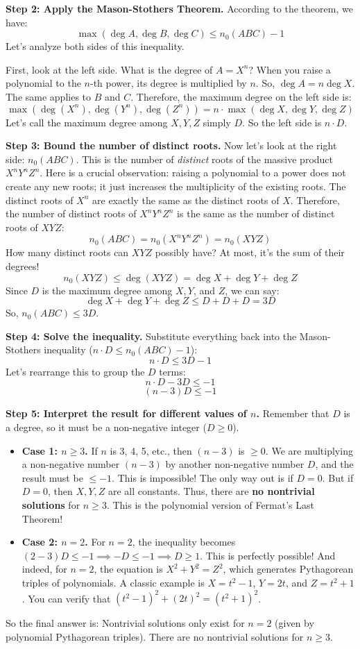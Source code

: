\begin{solution}
\textbf{Step 2: Apply the Mason-Stothers Theorem.}
According to the theorem, we have:
\[ \max(\deg A, \deg B, \deg C) \leq n_0(ABC) - 1 \]
Let's analyze both sides of this inequality.

First, look at the left side. What is the degree of $A = X^n$? When you raise a polynomial to the $n$-th power, its degree is multiplied by $n$. So, $\deg A = n \deg X$. The same applies to $B$ and $C$.
Therefore, the maximum degree on the left side is:
\[ \max(\deg(X^n), \deg(Y^n), \deg(Z^n)) = n \cdot \max(\deg X, \deg Y, \deg Z) \]
Let's call the maximum degree among $X, Y, Z$ simply $D$. So the left side is $n \cdot D$.

\textbf{Step 3: Bound the number of distinct roots.}
Now let's look at the right side: $n_0(ABC)$. This is the number of \textit{distinct} roots of the massive product $X^n Y^n Z^n$.
Here is a crucial observation: raising a polynomial to a power does not create any new roots; it just increases the multiplicity of the existing roots. The distinct roots of $X^n$ are exactly the same as the distinct roots of $X$.
Therefore, the number of distinct roots of $X^n Y^n Z^n$ is the same as the number of distinct roots of $X Y Z$:
\[ n_0(ABC) = n_0(X^n Y^n Z^n) = n_0(XYZ) \]
How many distinct roots can $XYZ$ possibly have? At most, it's the sum of their degrees!
\[ n_0(XYZ) \leq \deg(XYZ) = \deg X + \deg Y + \deg Z \]
Since $D$ is the maximum degree among $X, Y$, and $Z$, we can say:
\[ \deg X + \deg Y + \deg Z \leq D + D + D = 3D \]
So, $n_0(ABC) \leq 3D$.

\textbf{Step 4: Solve the inequality.}
Substitute everything back into the Mason-Stothers inequality ($n \cdot D \leq n_0(ABC) - 1$):
\[ n \cdot D \leq 3D - 1 \]
Let's rearrange this to group the $D$ terms:
\[ n \cdot D - 3D \leq -1 \]
\[ (n - 3)D \leq -1 \]

\textbf{Step 5: Interpret the result for different values of $n$.}
Remember that $D$ is a degree, so it must be a non-negative integer ($D \geq 0$).
\begin{itemize}
    \item \textbf{Case 1: $n \geq 3$.} If $n$ is 3, 4, 5, etc., then $(n - 3)$ is $\geq 0$. We are multiplying a non-negative number $(n-3)$ by another non-negative number $D$, and the result must be $\leq -1$. This is impossible! The only way out is if $D = 0$. But if $D=0$, then $X, Y, Z$ are all constants. Thus, there are \textbf{no nontrivial solutions} for $n \geq 3$. This is the polynomial version of Fermat's Last Theorem!
    \item \textbf{Case 2: $n = 2$.} For $n=2$, the inequality becomes $(2-3)D \leq -1 \implies -D \leq -1 \implies D \geq 1$. This is perfectly possible! And indeed, for $n=2$, the equation is $X^2 + Y^2 = Z^2$, which generates Pythagorean triples of polynomials. A classic example is $X = t^2 - 1$, $Y = 2t$, and $Z = t^2 + 1$. You can verify that $(t^2 - 1)^2 + (2t)^2 = (t^2 + 1)^2$.
\end{itemize}
So the final answer is: Nontrivial solutions only exist for $n = 2$ (given by polynomial Pythagorean triples). There are no nontrivial solutions for $n \geq 3$.
\end{solution}

